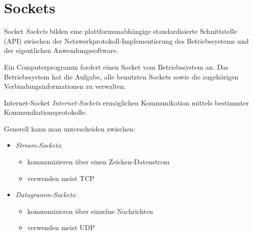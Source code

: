 \section{Sockets}

\begin{defi}{Socket}
    \emph{Sockets} bilden eine plattformunabhängige standardisierte Schnittstelle (API) zwischen der Netzwerkprotokoll-Implementierung des Betriebssystems und der eigentlichen Anwendungssoftware.

    Ein Computerprogramm fordert einen Socket vom Betriebssystem an.
    Das Betriebssystem hat die Aufgabe, alle benutzten Sockets sowie die zugehörigen Verbindungsinformationen zu verwalten.
\end{defi}

\begin{defi}{Internet-Socket}
    \emph{Internet-Sockets} ermöglichen Kommunikation mittels bestimmter Kommunikationsprotokolle.

    Generell kann man unterscheiden zwischen:
    \begin{itemize}
        \item \emph{Stream-Sockets}:
              \begin{itemize}
                  \item kommunizieren über einen Zeichen-Datenstrom
                  \item verwenden meist TCP
              \end{itemize}
        \item \emph{Datagramm-Sockets}:
              \begin{itemize}
                  \item kommunizieren über einzelne Nachrichten
                  \item verwenden meist UDP
              \end{itemize}
    \end{itemize}
\end{defi}

